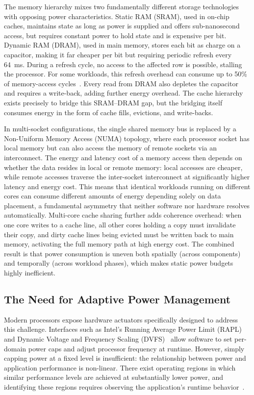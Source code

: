 The memory hierarchy mixes two fundamentally different storage technologies with opposing
power characteristics.
Static RAM (SRAM), used in on-chip caches, maintains state as long as power is supplied
and offers sub-nanosecond access, but requires constant power to hold state and is
expensive per bit.
Dynamic RAM (DRAM), used in main memory, stores each bit as charge on a capacitor,
making it far cheaper per bit but requiring periodic refresh every 64~ms.
During a refresh cycle, no access to the affected row is possible, stalling the processor.
For some workloads, this refresh overhead can consume up to 50\% of memory-access
cycles~\cite{david2010rapl}.
Every read from DRAM also depletes the capacitor and requires a write-back, adding
further energy overhead.
The cache hierarchy exists precisely to bridge this SRAM--DRAM gap, but the bridging
itself consumes energy in the form of cache fills, evictions, and write-backs.

In multi-socket configurations, the single shared memory bus is replaced by a
Non-Uniform Memory Access (NUMA) topology, where each processor socket has local
memory but can also access the memory of remote sockets via an interconnect.
The energy and latency cost of a memory access then depends on whether the data resides
in local or remote memory: local accesses are cheaper, while remote accesses traverse
the inter-socket interconnect at significantly higher latency and energy cost.
This means that identical workloads running on different cores can consume different
amounts of energy depending solely on data placement, a fundamental asymmetry that
neither software nor hardware resolves automatically.
Multi-core cache sharing further adds coherence overhead: when one core writes to a
cache line, all other cores holding a copy must invalidate their copy, and dirty cache
lines being evicted must be written back to main memory, activating the full memory
path at high energy cost.
The combined result is that power consumption is uneven both spatially (across
components) and temporally (across workload phases), which makes static power
budgets highly inefficient.

\subsection*{The Need for Adaptive Power Management}

Modern processors expose hardware actuators specifically designed to address this
challenge.
Interfaces such as Intel's Running Average Power Limit (RAPL)~\cite{david2010rapl} and
Dynamic Voltage and Frequency Scaling (DVFS)~\cite{4658633} allow software to set
per-domain power caps and adjust processor frequency at runtime.
However, simply capping power at a fixed level is insufficient: the relationship between
power and application performance is non-linear.
There exist operating regions in which similar performance levels are achieved at
substantially lower power, and identifying these regions requires observing the
application's runtime behavior~\cite{czarnul2019energy}.

